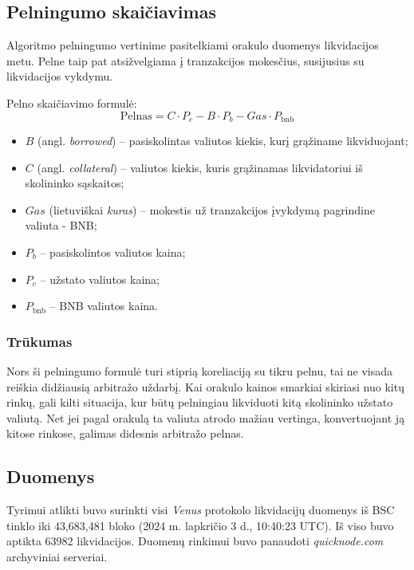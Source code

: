 \documentclass{VUMIFPSkursinis}
\begin{document}
\subsection{Pelningumo skaičiavimas}

Algoritmo pelningumo vertinime pasitelkiami orakulo duomenys likvidacijos metu. Pelne taip pat atsižvelgiama į tranzakcijos mokesčius, susijusius su likvidacijos vykdymu.

\noindent Pelno skaičiavimo formulė:
\[
\text{Pelnas} = C \cdot P_c - B \cdot P_b - Gas \cdot P_\text{bnb}
\]

\begin{itemize}
    \item $B$ (angl. \textit{borrowed}) – pasiskolintas valiutos kiekis, kurį grąžiname likviduojant;
    \item $C$ (angl. \textit{collateral}) – valiutos kiekis, kuris grąžinamas likvidatoriui iš skolininko sąskaitos;
    \item $Gas$ (lietuviškai \textit{kuras}) – mokestis už tranzakcijos įvykdymą pagrindine valiuta - BNB;
    \item $P_b$ – pasiskolintos valiutos kaina;
    \item $P_c$ – užstato valiutos kaina;
    \item $P_\text{bnb}$ – BNB valiutos kaina.
\end{itemize}

\subsubsection{Trūkumas}
Nors ši pelningumo formulė turi stiprią koreliaciją su tikru pelnu, tai ne visada reiškia didžiausią arbitražo uždarbį. Kai orakulo kainos smarkiai skiriasi nuo kitų rinkų, gali kilti situacija, kur būtų pelningiau likviduoti kitą skolininko užstato valiutą. Net jei pagal orakulą ta valiuta atrodo mažiau vertinga, konvertuojant ją kitose rinkose, galimas didesnis arbitražo pelnas.

\subsection{Duomenys}

Tyrimui atlikti buvo surinkti visi \textit{Venus} protokolo likvidacijų duomenys iš BSC tinklo iki 43,683,481 bloko (2024 m. lapkričio 3 d., 10:40:23 UTC). Iš viso buvo aptikta 63982 likvidacijos. Duomenų rinkimui buvo panaudoti \textit{quicknode.com} archyviniai serveriai.
\end{document}
